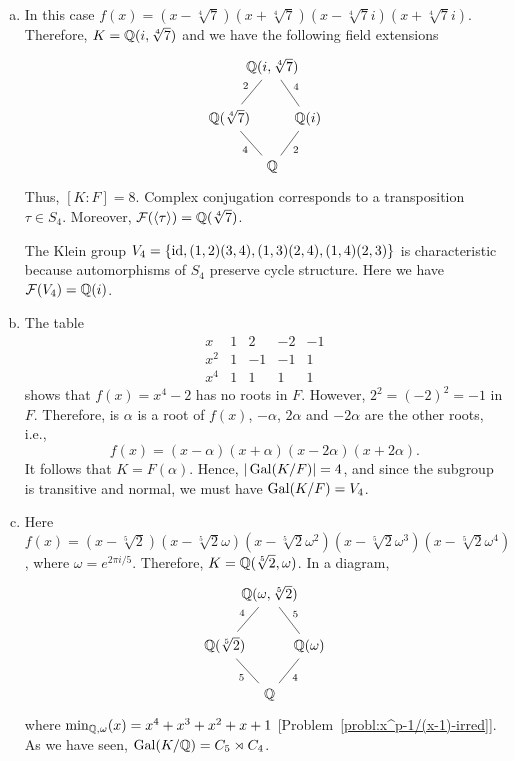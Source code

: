 \begin{solution}${}$
    \begin{enumerate}[a), font=\upshape]
        \item In this case $f(x)=(x-\sqrt[4]7)(x+\sqrt[4]7)
        (x-\sqrt[4]7i)(x+\sqrt[4]7i)$. Therefore, $K=\mathbb{Q}(i,\sqrt[4]7)$ and we have the following field extensions
        $$
            \begin{tikzcd}[arrows={-},column sep=-0.4cm]
                    &{\Q(i,\sqrt[4]7)}\\
                {\Q(\sqrt[4]7)}
                        \arrow[ru,"2"]
                    &&\Q(i)
                        \arrow[lu,"4"']\\
                    &\Q
                        \arrow[ru,"2"']
                        \arrow[lu,"4"]
            \end{tikzcd}
        $$
        Thus, $[K:F]=8$. Complex conjugation corresponds to a transposition $\tau\in S_4$. Moreover, $\mathcal F(\langle\tau\rangle)=\mathbb{Q}(\sqrt[4]7)$.
        
        The Klein group $V_4= \{\operatorname{id},(1,2)(3,4),(1,3)(2,4),(1,4)(2,3)\}$ is characteristic because automorphisms of $S_4$ preserve cycle structure. Here we have $\mathcal F(V_4)=\mathbb{Q}(i)$.

        \item The table
        $$
            \begin{array}{l|rrrr}
                 x&1&2&-2&-1\\
                 x^2&1&-1&-1&1\\
                 x^4&1&1&1&1
            \end{array}
        $$
        shows that $f(x)=x^4-2$ has no roots in $F$. However, $2^2=(-2)^2=-1$ in $F$. Therefore, is $\alpha$ is a root of $f(x)$, $-\alpha$, $2\alpha$ and $-2\alpha$ are the other roots, i.e.,
        $$
            f(x) = (x-\alpha)(x+\alpha)(x-2\alpha)(x+2\alpha).
        $$
        It follows that $K=F(\alpha)$. Hence, $|\operatorname{Gal}(K/F)|=4$, and since the subgroup is transitive and normal, we must have $\operatorname{Gal}(K/F)=V_4$.

        \item Here $f(x)=(x-\sqrt[5]2)(x-\sqrt[5]2\omega)(x-\sqrt[5]2\omega^2)(x-\sqrt[5]2\omega^3)(x-\sqrt[5]2\omega^4)$, where $\omega=e^{2\pi i/5}$. Therefore, $K=\mathbb{Q}(\sqrt[5]2,\omega)$. In a diagram,
        $$
            \begin{tikzcd}[arrows={-},column sep=-0.4cm]
                    &{\Q(\omega,\sqrt[5]2)}\\
                {\Q(\sqrt[5]2)}
                        \arrow[ru,"4"]
                    &&\Q(\omega)
                        \arrow[lu,"5"']\\
                    &\Q
                        \arrow[ru,"4"']
                        \arrow[lu,"5"]
            \end{tikzcd}
        $$
        where $\operatorname{min}_{\mathbb{Q},\omega}(x)=x^4+x^3+x^2+x+1$ [Problem~\ref{probl:x^p-1/(x-1)-irred}]. As we have seen, $\operatorname{Gal}(K/\mathbb{Q})=C_5\rtimes C_4$. 


\end{enumerate}
\end{solution}
